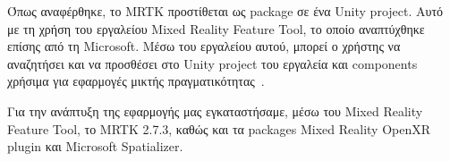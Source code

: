 Όπως αναφέρθηκε, το MRTK προστίθεται ως package σε ένα Unity project. Αυτό με τη χρήση του εργαλείου Mixed Reality Feature Tool, το οποίο αναπτύχθηκε επίσης από τη Microsoft. Μέσω του εργαλείου αυτού, μπορεί ο χρήστης να αναζητήσει και να προσθέσει στο Unity project του εργαλεία και components χρήσιμα για εφαρμογές μικτής πραγματικότητας~\cite{seankerawala_2022_welcome}.

Για την ανάπτυξη της εφαρμογής μας εγκαταστήσαμε, μέσω του Mixed Reality Feature Tool, το MRTK 2.7.3, καθώς και τα packages Mixed Reality OpenXR plugin και Microsoft Spatializer.

